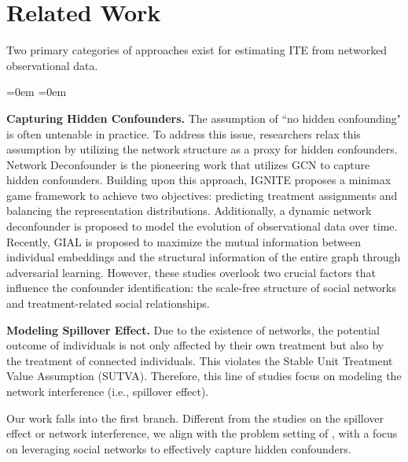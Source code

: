 \documentclass[twoside,leqno,twocolumn]{article}
\begin{document}
\section{Related Work}
Two primary categories of approaches exist for estimating ITE from networked observational data.
\begin{list}{}{\leftmargin=0em \itemindent=0em \topsep=0pt \parsep=0pt \itemsep=0pt}
\item \textbf{Capturing Hidden Confounders.} The assumption of ``no hidden confounding" is often untenable in practice. To address this issue, researchers relax this assumption by utilizing the network structure as a proxy for hidden confounders\cite{veitch2019using,guo2020learning,ma2021deconfounding,chu2021graph,guo2021ignite}. Network Deconfounder \cite{guo2020learning} is the pioneering work that utilizes GCN to capture hidden confounders. Building upon this approach, 
IGNITE \cite{guo2021ignite} proposes a minimax game framework to achieve two objectives: predicting treatment assignments and balancing the representation distributions. Additionally, a dynamic network deconfounder \cite{ma2021deconfounding} is proposed to model the evolution of observational data over time. Recently, GIAL \cite{chu2021graph} is proposed to maximize the mutual information between individual embeddings and the structural information of the entire graph through adversarial learning. However, these studies overlook two crucial factors that influence the confounder identification: the scale-free structure of social networks and treatment-related social relationships.
\item \textbf{Modeling Spillover Effect.} Due to the existence of networks, the potential outcome of individuals is not only affected by their own treatment but also by the treatment of connected individuals. This violates the Stable Unit Treatment Value Assumption (SUTVA). Therefore, this line of studies \cite{ma2022learning, jiang2022estimating,ma2021causal,tran2022heterogeneous,rakesh2018linked} focus on modeling the network interference (i.e., spillover effect).
\end{list}


Our work falls into the first branch. Different from the studies on the spillover effect or network interference, we align with the problem setting of \cite{guo2020learning,guo2021ignite,chu2021graph}, with a focus on leveraging social networks to effectively capture hidden confounders.
\vspace{-0.5em}
\end{document}
